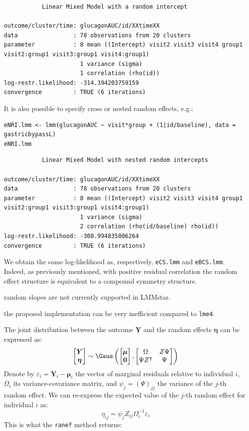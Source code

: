 \documentclass[12pt]{article}
\newcommand\Warning[1][3ex]{%
\renewcommand\stacktype{L}%
\scaleto{\stackon[1.3pt]{\color{red}$\triangle$}{\tiny\bfseries !}}{#1}%
\xspace
}
\newcommand\trans[1]{{#1}^\intercal}%
\newcommand\Veta{\boldsymbol{\eta}}
\newcommand{\VY}{\boldsymbol{Y}}
\begin{document}
\begin{verbatim}
	       Linear Mixed Model with a random intercept 

outcome/cluster/time: glucagonAUC/id/XXtimeXX 
data                : 78 observations from 20 clusters 
parameter           : 8 mean ((Intercept) visit2 visit3 visit4 group1 visit2:group1 visit3:group1 visit4:group1) 
                      1 variance (sigma) 
                      1 correlation (rho(id)) 
log-restr.likelihood: -314.394203759159 
convergence         : TRUE (6 iterations)
\end{verbatim}


It is also possible to specify cross or nested random effects, e.g.:
\lstset{language=r,label= ,caption= ,captionpos=b,numbers=none}
\begin{lstlisting}
eNRI.lmm <- lmm(glucagonAUC ~ visit*group + (1|id/baseline), data = gastricbypassL)
eNRI.lmm
\end{lstlisting}

\begin{verbatim}
	       Linear Mixed Model with nested random intercepts 

outcome/cluster/time: glucagonAUC/id/XXtimeXX 
data                : 78 observations from 20 clusters 
parameter           : 8 mean ((Intercept) visit2 visit3 visit4 group1 visit2:group1 visit3:group1 visit4:group1) 
                      1 variance (sigma) 
                      2 correlation (rho(id/baseline) rho(id)) 
log-restr.likelihood: -308.994835006264 
convergence         : TRUE (6 iterations)
\end{verbatim}


We obtain the same log-likelihood as, respectively, \texttt{eCS.lmm} and
\texttt{eBCS.lmm}. Indeed, as previously mentioned, with positive residual
correlation the random effect structure is equivalent to a compound
symmetry structure. \newline \Warning random slopes are not currently
supported in LMMstar. \newline \Warning the proposed implementation can
be very inefficient compared to \texttt{lme4}.

\bigskip

The joint distribution between the outcome \(\VY\)
and the random effects \(\Veta\) can be expressed as:
\[
\begin{bmatrix} \VY \\ \Veta \end{bmatrix} \sim \Gaus\left(\begin{bmatrix} \boldsymbol{\mu} \\ \mathbf{0} \end{bmatrix}, \begin{bmatrix} \Omega & Z \Psi \\ \Psi \trans{Z} & \Psi \end{bmatrix}\right)
\]
Denote by \(\varepsilon_i=\VY_i-\boldsymbol{\mu}_i\) the vector of
marginal residuals relative to individual \(i\), \(\Omega_i\) its
variance-covariance matrix, and \(\psi_j=(\Psi)_{jj}\) the variance of the
\(j\)-th random effect. We can re-express the expected value of the
\(j\)-th random effect for individual \(i\) as:
\[ \eta_{ij} = \psi_{j} Z_{ij} \Omega_i^{-1}\varepsilon_i \]
This is what the \texttt{ranef} method returns:
\end{document}
